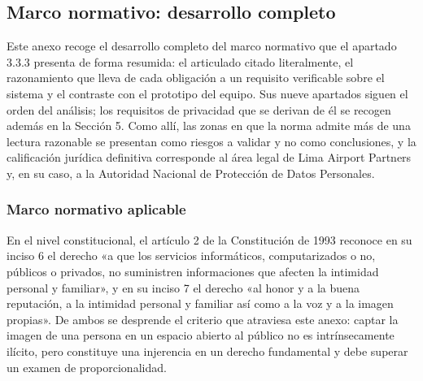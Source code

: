 %
%


\subsection{Marco normativo: desarrollo completo}
\label{anx:marco}

Este anexo recoge el desarrollo completo del marco normativo que el
apartado 3.3.3 presenta de forma resumida: el articulado citado
literalmente, el razonamiento que lleva de cada obligación a un
requisito verificable sobre el sistema y el contraste con el prototipo
del equipo. Sus nueve apartados siguen el orden del análisis; los
requisitos de privacidad que se derivan de él se recogen además en la
Sección 5. Como allí, las zonas en que la norma admite más de una
lectura razonable se presentan como riesgos a validar y no como
conclusiones, y la calificación jurídica definitiva corresponde al área
legal de Lima Airport Partners y, en su caso, a la Autoridad Nacional de
Protección de Datos Personales.

\subsubsection{Marco normativo aplicable}

En el nivel constitucional, el artículo 2 de la Constitución de 1993
reconoce en su inciso 6 el derecho «a que los servicios informáticos,
computarizados o no, públicos o privados, no suministren informaciones
que afecten la intimidad personal y familiar», y en su inciso 7 el
derecho «al honor y a la buena reputación, a la intimidad personal y
familiar así como a la voz y a la imagen propias». De ambos se desprende
el criterio que atraviesa este anexo: captar la imagen de una persona en
un espacio abierto al público no es intrínsecamente ilícito, pero
constituye una injerencia en un derecho fundamental y debe superar un
examen de proporcionalidad.

